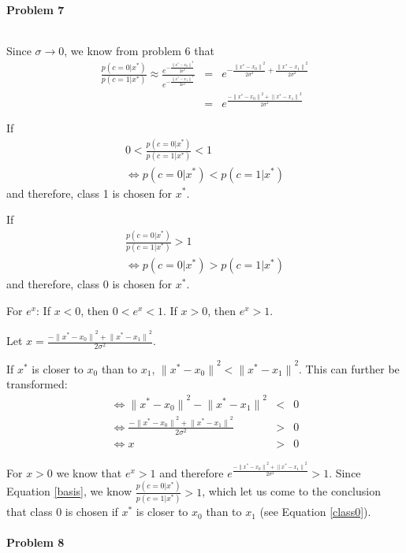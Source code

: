 \documentclass{article}
\begin{document}
\paragraph*{Problem 7}
$\;$ 

Since $\sigma \rightarrow 0$, we know from problem 6 that
\begin{eqnarray}
\frac{p(c = 0|x^*)}{p(c = 1|x^*)} \approx \frac{e^{-\frac{{\|x^*-x_0\|}^2}{2\sigma^2}}}{e^{-\frac{{\|x^*-x_1\|}^2}{2\sigma^2}}} &=& e^{-\frac{{\|x^*-x_0\|}^2}{2\sigma^2}+\frac{{\|x^*-x_1\|}^2}{2\sigma^2}} \label{basis}\\
&=& e^{\frac{-{\|x^*-x_0\|}^2+{\|x^*-x_1\|}^2}{2\sigma^2}}
\end{eqnarray}

If 
\begin{eqnarray}
0 < \frac{p(c = 0|x^*)}{p(c = 1|x^*)} < 1 \label{class1}\\
\Leftrightarrow p(c = 0|x^*) < p(c = 1|x^*)
\end{eqnarray} 
and therefore, class 1 is chosen for $x^*$.

If 
\begin{eqnarray}
\frac{p(c = 0|x^*)}{p(c = 1|x^*)} > 1 \label{class0}\\
\Leftrightarrow p(c = 0|x^*) > p(c = 1|x^*)
\end{eqnarray} 
and therefore, class 0 is chosen for $x^*$.

For $e^x$: If $x < 0$, then $0 < e^x < 1$. If $x > 0$, then $e^x > 1$.

Let $x = \frac{-{\|x^*-x_0\|}^2+{\|x^*-x_1\|}^2}{2\sigma^2}$.

If $x^*$ is closer to $x_0$ than to $x_1$, ${\|x^*-x_0\|}^2 < {\|x^*-x_1\|}^2$. This can further be transformed:
\begin{eqnarray}
\Leftrightarrow {\|x^*-x_0\|}^2 - {\|x^*-x_1\|}^2 &<& 0\\
\Leftrightarrow \frac{-{\|x^*-x_0\|}^2+{\|x^*-x_1\|}^2}{2\sigma^2} &>& 0\\
\Leftrightarrow x &>& 0
\end{eqnarray}

For $x > 0$ we know that $e^x > 1$ and therefore $e^{\frac{-{\|x^*-x_0\|}^2+{\|x^*-x_1\|}^2}{2\sigma^2}} > 1$. Since Equation \ref{basis}, we know $\frac{p(c = 0|x^*)}{p(c = 1|x^*)} > 1$, which let us come to the conclusion that class 0 is chosen if $x^*$ is closer to $x_0$ than to $x_1$ (see Equation \ref{class0}).


\paragraph*{Problem 8}
$\;$ 
\end{document}
